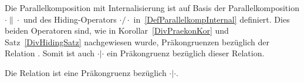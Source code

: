 Die Parallelkomposition mit Internalisierung ist auf Basis der
Parallelkomposition $\cdot \|\cdot$ und des Hiding-Operators $\cdot /\cdot$
in~\ref{DefParallelkompInternal} definiert. Dies beiden Operatoren sind, wie in
Korollar~\ref{DivPraekonKor} und Satz~\ref{DivHidingSatz} nachgewiesen wurde,
Präkongruenzen bezüglich der Relation \DRel{}. Somit ist auch $\cdot |\cdot$
ein Präkongruenz bezüglich dieser Relation.

\begin{Kor}
  Die Relation \DRel{} ist eine Präkongruenz bezüglich $\cdot |\cdot$.
\end{Kor}
